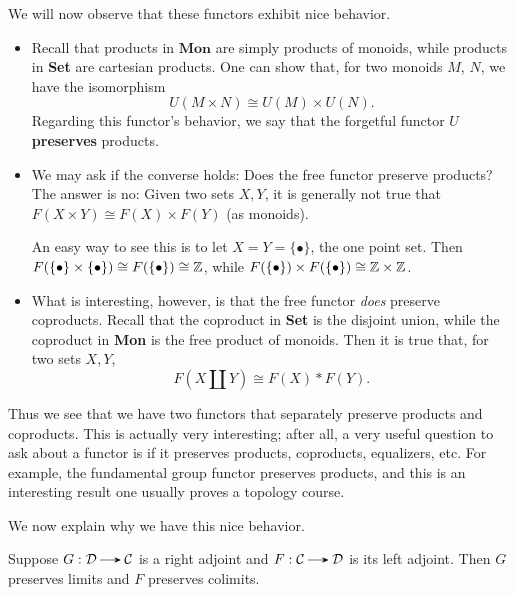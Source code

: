     We will now observe that these functors exhibit nice behavior. 
    \begin{itemize}
        \item 
        Recall that products in $\textbf{Mon}$ are simply products of monoids, while 
        products in \textbf{Set} are cartesian products. One can show that, for two monoids 
        $M$, $N$, we have the isomorphism 
        \[
            U(M \times N) \cong U(M) \times U(N).
        \]
        Regarding this functor's behavior, 
        we say that the forgetful functor $U$ \textbf{preserves} products. 

        \item We may ask if the converse holds: Does the free functor preserve products? 
        The answer is no: Given two sets $X, Y$, it is generally not true that 
        $F(X \times Y) \cong F(X) \times F(Y)$ (as monoids). 

        An easy way to see this is to let $X = Y = \{\bullet\}$, the one point set. Then 
        $F(\{\bullet\} \times \{\bullet\}) \cong F(\{\bullet\}) \cong \mathbb{Z}$, while 
        $F(\{\bullet\}) \times F(\{\bullet\}) \cong \mathbb{Z} \times \mathbb{Z}$. 

        \item What is interesting, however, is that the free functor \emph{does} preserve 
        coproducts. Recall that the coproduct in \textbf{Set} is the disjoint union, while the 
        coproduct in \textbf{Mon} is the free product of monoids. Then it is true that, for two 
        sets $X, Y$, 
        \[
            F(X \amalg Y) \cong F(X) * F(Y).
        \]
    \end{itemize}
    Thus we see that we have two functors that separately preserve 
    products and coproducts. This is actually very interesting; after all, a 
    very useful question to ask about a functor is if it preserves products, coproducts, equalizers, 
    etc. For example, the fundamental group functor preserves products, and this is an interesting result 
    one usually proves a topology course. 
    
    We now explain why we have this nice behavior.
    \begin{thm}\label{theorem:RAPL}
        Suppose $G: \dd \to \cc$ is a right adjoint and $F: \cc \to \dd$ is its left adjoint.
        Then $G$ preserves limits and $F$ preserves colimits.
    \end{thm}

